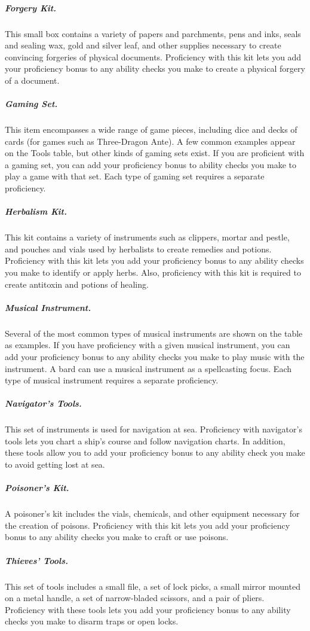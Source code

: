 \subparagraph*{Forgery Kit.} This small box contains a variety of papers and parchments, pens and inks, seals and sealing wax, gold and silver leaf, and other supplies necessary to create convincing forgeries of physical documents. Proficiency with this kit lets you add your proficiency bonus to any ability checks you make to create a physical forgery of a document.

\subparagraph*{Gaming Set.} This item encompasses a wide range of game pieces, including dice and decks of cards (for games such as Three-Dragon Ante). A few common examples appear on the Tools table, but other kinds of gaming sets exist. If you are proficient with a gaming set, you can add your proficiency bonus to ability checks you make to play a game with that set. Each type of gaming set requires a separate proficiency.

\subparagraph*{Herbalism Kit.} This kit contains a variety of instruments such as clippers, mortar and pestle, and pouches and vials used by herbalists to create remedies and potions. Proficiency with this kit lets you add your proficiency bonus to any ability checks you make to identify or apply herbs. Also, proficiency with this kit is required to create antitoxin and potions of healing.

\subparagraph*{Musical Instrument.} Several of the most common types of musical instruments are shown on the table as examples. If you have proficiency with a given musical instrument, you can add your proficiency bonus to any ability checks you make to play music with the instrument. A bard can use a musical instrument as a spellcasting focus. Each type of musical instrument requires a separate proficiency.

\subparagraph*{Navigator's Tools.} This set of instruments is used for navigation at sea. Proficiency with navigator's tools lets you chart a ship's course and follow navigation charts. In addition, these tools allow you to add your proficiency bonus to any ability check you make to avoid getting lost at sea.

\subparagraph*{Poisoner's Kit.} A poisoner's kit includes the vials, chemicals, and other equipment necessary for the creation of poisons. Proficiency with this kit lets you add your proficiency bonus to any ability checks you make to craft or use poisons.

\subparagraph*{Thieves' Tools.} This set of tools includes a small file, a set of lock picks, a small mirror mounted on a metal handle, a set of narrow-bladed scissors, and a pair of pliers. Proficiency with these tools lets you add your proficiency bonus to any ability checks you make to disarm traps or open locks.

